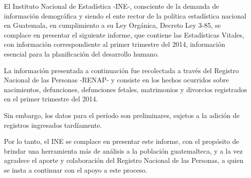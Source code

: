 $\ $\\[0.5cm]
\thispagestyle{empty}




$\ $\\



El Instituto Nacional de Estadística -INE-, consciente de la demanda de información demográfica y siendo el ente rector de la política estadística nacional en Guatemala, en cumplimiento a su Ley Orgánica, Decreto Ley 3-85, se complace en presentar el siguiente informe, que contiene las {\Bold Estadísticas Vitales}, con información correspondiente al {\Bold primer trimestre del 2014}, información esencial para la planificación del desarrollo humano.

La información presentada a continuación fue recolectada a través del Registro Nacional de las Personas  -RENAP- y consiste en los hechos ocurridos sobre nacimientos, defunciones, defunciones fetales, matrimonios y divorcios registrados en el primer trimestre del 2014. 

Sin embargo, los datos para el período son preliminares, sujetos a la adición de registros ingresados tardíamente.

Por lo tanto, el INE se complace en presentar este informe, con el propósito de brindar una herramienta más de análisis a la población guatemalteca, y a la vez agradece el aporte y colaboración del Registro Nacional de las Personas, a quien se insta  a continuar con el apoyo a este proceso.


\thispagestyle{empty}


\cleardoublepage
